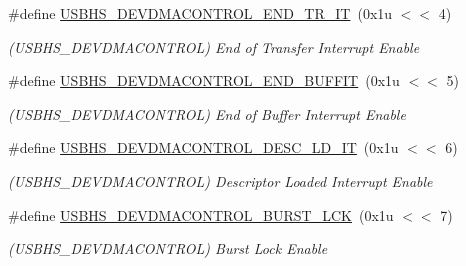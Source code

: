 \begin{DoxyCompactItemize}
\mbox{\label{group__SAMV71__USBHS_ga3a52e66b770dc75e0bd3fa0306a56292}} 
\#define \mbox{\hyperlink{group__SAMV71__USBHS_ga3a52e66b770dc75e0bd3fa0306a56292}{U\+S\+B\+H\+S\+\_\+\+D\+E\+V\+D\+M\+A\+C\+O\+N\+T\+R\+O\+L\+\_\+\+E\+N\+D\+\_\+\+T\+R\+\_\+\+IT}}~(0x1u $<$$<$ 4)
\begin{DoxyCompactList}\small\item\em (U\+S\+B\+H\+S\+\_\+\+D\+E\+V\+D\+M\+A\+C\+O\+N\+T\+R\+OL) End of Transfer Interrupt Enable \end{DoxyCompactList}\item 
\mbox{\label{group__SAMV71__USBHS_ga86c6fe730699f43a24dc19e6c7f2ac66}} 
\#define \mbox{\hyperlink{group__SAMV71__USBHS_ga86c6fe730699f43a24dc19e6c7f2ac66}{U\+S\+B\+H\+S\+\_\+\+D\+E\+V\+D\+M\+A\+C\+O\+N\+T\+R\+O\+L\+\_\+\+E\+N\+D\+\_\+\+B\+U\+F\+F\+IT}}~(0x1u $<$$<$ 5)
\begin{DoxyCompactList}\small\item\em (U\+S\+B\+H\+S\+\_\+\+D\+E\+V\+D\+M\+A\+C\+O\+N\+T\+R\+OL) End of Buffer Interrupt Enable \end{DoxyCompactList}\item 
\mbox{\label{group__SAMV71__USBHS_ga86a14d59330c7ea07601a2b61ac6529e}} 
\#define \mbox{\hyperlink{group__SAMV71__USBHS_ga86a14d59330c7ea07601a2b61ac6529e}{U\+S\+B\+H\+S\+\_\+\+D\+E\+V\+D\+M\+A\+C\+O\+N\+T\+R\+O\+L\+\_\+\+D\+E\+S\+C\+\_\+\+L\+D\+\_\+\+IT}}~(0x1u $<$$<$ 6)
\begin{DoxyCompactList}\small\item\em (U\+S\+B\+H\+S\+\_\+\+D\+E\+V\+D\+M\+A\+C\+O\+N\+T\+R\+OL) Descriptor Loaded Interrupt Enable \end{DoxyCompactList}\item 
\mbox{\label{group__SAMV71__USBHS_ga943997858212b2d56ab97dda52ffeb58}} 
\#define \mbox{\hyperlink{group__SAMV71__USBHS_ga943997858212b2d56ab97dda52ffeb58}{U\+S\+B\+H\+S\+\_\+\+D\+E\+V\+D\+M\+A\+C\+O\+N\+T\+R\+O\+L\+\_\+\+B\+U\+R\+S\+T\+\_\+\+L\+CK}}~(0x1u $<$$<$ 7)
\begin{DoxyCompactList}\small\item\em (U\+S\+B\+H\+S\+\_\+\+D\+E\+V\+D\+M\+A\+C\+O\+N\+T\+R\+OL) Burst Lock Enable \end{DoxyCompactList}\item 

\end{DoxyCompactItemize}

